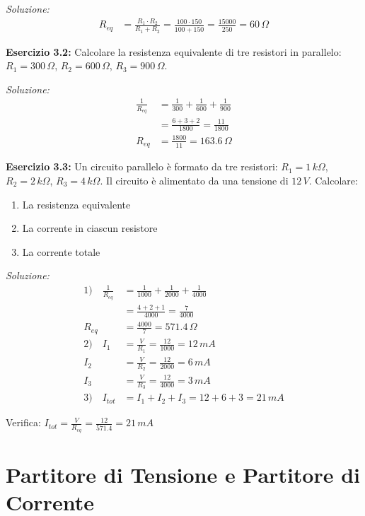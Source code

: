 \documentclass[a4paper,12pt]{article}
\begin{document}
\textit{Soluzione:}
\begin{align*}
R_{eq} &= \frac{R_1 \cdot R_2}{R_1 + R_2} = \frac{100 \cdot 150}{100 + 150} = \frac{15000}{250} = 60\,\Omega
\end{align*}

\textbf{Esercizio 3.2:} Calcolare la resistenza equivalente di tre resistori in parallelo: $R_1 = 300\,\Omega$, $R_2 = 600\,\Omega$, $R_3 = 900\,\Omega$.

\textit{Soluzione:}
\begin{align*}
\frac{1}{R_{eq}} &= \frac{1}{300} + \frac{1}{600} + \frac{1}{900} \\
&= \frac{6 + 3 + 2}{1800} = \frac{11}{1800} \\
R_{eq} &= \frac{1800}{11} = 163.6\,\Omega
\end{align*}

\textbf{Esercizio 3.3:} Un circuito parallelo è formato da tre resistori: $R_1 = 1\,k\Omega$, $R_2 = 2\,k\Omega$, $R_3 = 4\,k\Omega$. Il circuito è alimentato da una tensione di $12\,V$. Calcolare:
\begin{enumerate}
    \item La resistenza equivalente
    \item La corrente in ciascun resistore
    \item La corrente totale
\end{enumerate}

\textit{Soluzione:}
\begin{align*}
1)\quad \frac{1}{R_{eq}} &= \frac{1}{1000} + \frac{1}{2000} + \frac{1}{4000} \\
&= \frac{4 + 2 + 1}{4000} = \frac{7}{4000} \\
R_{eq} &= \frac{4000}{7} = 571.4\,\Omega \\
2)\quad I_1 &= \frac{V}{R_1} = \frac{12}{1000} = 12\,mA \\
I_2 &= \frac{V}{R_2} = \frac{12}{2000} = 6\,mA \\
I_3 &= \frac{V}{R_3} = \frac{12}{4000} = 3\,mA \\
3)\quad I_{tot} &= I_1 + I_2 + I_3 = 12 + 6 + 3 = 21\,mA
\end{align*}

Verifica: $I_{tot} = \frac{V}{R_{eq}} = \frac{12}{571.4} = 21\,mA$ \checkmark

\newpage
\section{Partitore di Tensione e Partitore di Corrente}
\end{document}
